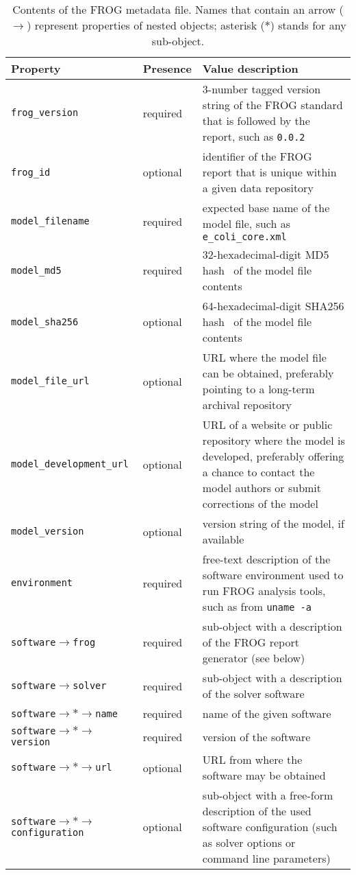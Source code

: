 \begin{table}\tablefont
\begin{tabular}{llp{30em}}
\toprule
Property & Presence & Value description \\
\midrule
\verb|frog_version|
 & required
 & 3-number tagged version string of the FROG standard that is followed by the report, such as \verb|0.0.2|
 \\
\verb|frog_id|
 & optional
 & identifier of the FROG report that is unique within a given data repository
 \\
\verb|model_filename|
 & required
 & expected base name of the model file, such as \verb|e_coli_core.xml|
 \\
\verb|model_md5|
 & required
 & 32-hexadecimal-digit MD5 hash~\cite{rfc1321} of the model file contents
 \\
\verb|model_sha256|
 & optional
 & 64-hexadecimal-digit SHA256 hash~\cite{national2008secure} of the model file contents
 \\
\verb|model_file_url|
 & optional
 & URL where the model file can be obtained, preferably pointing to a long-term archival repository
 \\
\verb|model_development_url|
 & optional
 & URL of a website or public repository where the model is developed, preferably offering a chance to contact the model authors or submit corrections of the model
 \\
\verb|model_version|
 & optional
 & version string of the model, if available
 \\
\verb|environment|
 & required
 & free-text description of the software environment used to run FROG analysis tools, such as from \verb|uname -a|
 \\
\verb|software|$\to$\verb|frog|
 & required
 & sub-object with a description of the FROG report generator (see below)
 \\
\verb|software|$\to$\verb|solver|
 & required
 & sub-object with a description of the solver software
 \\\addlinespace
\verb|software|$\to\ast\to$\verb|name|
 & required
 & name of the given software
 \\
\verb|software|$\to\ast\to$\verb|version|
 & required
 & version of the software
 \\
\verb|software|$\to\ast\to$\verb|url|
 & optional
 & URL from where the software may be obtained
 \\
\verb|software|$\to\ast\to$\verb|configuration|
 & optional
 & sub-object with a free-form description of the used software configuration (such as solver options or command line parameters)
 \\
\bottomrule
\end{tabular}
\caption[Contents of the FROG metadata file.]{Contents of the FROG metadata file. Names that contain an arrow ($\to$) represent properties of nested objects; asterisk ($\ast$) stands for any sub-object.}
\label{tab:metadata}
\end{table}

